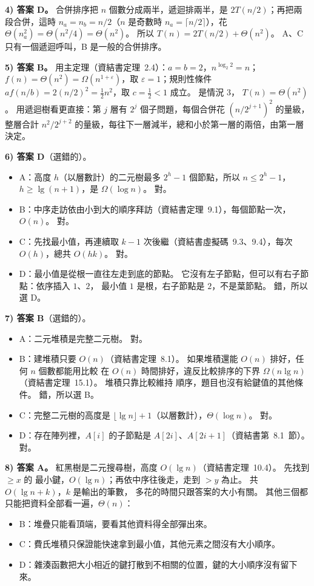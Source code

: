 \begin{pastsoln}
\textbf{4) 答案 D。} 合併排序把 $n$ 個數分成兩半，遞迴排兩半，是 $2T(n/2)$；再把兩段合併，這時
$n_a = n_b = n/2$（$n$ 是奇數時 $n_a = \lceil n/2 \rceil$），花 $\Theta(n_a^2) = \Theta(n^2/4) =
\Theta(n^2)$。 所以 $T(n) = 2T(n/2) + \Theta(n^2)$。 A、C 只有一個遞迴呼叫，B 是一般的合併排序。

\textbf{5) 答案 B。} 用主定理（資結書定理~2.4）：$a = b = 2$，$n^{\log_2 2} = n$；
$f(n) = \Theta(n^2) = \Omega(n^{1 + \varepsilon})$，取 $\varepsilon = 1$；規則性條件
$a f(n/b) = 2 (n/2)^2 = \frac{1}{2} n^2$，取 $c = \frac{1}{2} < 1$ 成立。 是情況 3，
$T(n) = \Theta(n^2)$。 用遞迴樹看更直接：第 $j$ 層有 $2^j$ 個子問題，每個合併花 $(n/2^{j+1})^2$
的量級，整層合計 $n^2 / 2^{j+2}$ 的量級，每往下一層減半，總和小於第一層的兩倍，由第一層決定。

\textbf{6) 答案 D}（選錯的）。
\begin{itemize}
\item A：高度 $h$（以層數計）的二元樹最多 $2^h - 1$ 個節點，所以 $n \le 2^h - 1$，
$h \ge \lg(n+1)$，是 $\Omega(\log n)$。 對。
\item B：中序走訪依由小到大的順序拜訪（資結書定理~9.1），每個節點一次，$O(n)$。 對。
\item C：先找最小值，再連續取 $k - 1$ 次後繼（資結書虛擬碼~9.3、9.4），每次 $O(h)$，總共 $O(hk)$。
對。
\item D：最小值是從根一直往左走到底的節點。 它沒有左子節點，但可以有右子節點：依序插入 $1$、$2$，
最小值 $1$ 是根，右子節點是 $2$，不是葉節點。 錯，所以選 D。
\end{itemize}

\textbf{7) 答案 B}（選錯的）。
\begin{itemize}
\item A：二元堆積是完整二元樹。 對。
\item B：建堆積只要 $O(n)$（資結書定理~8.1）。 如果堆積還能 $O(n)$ 排好，任何 $n$ 個數都能用比較
在 $O(n)$ 時間排好，違反比較排序的下界 $\Omega(n \lg n)$（資結書定理~15.1）。 堆積只靠比較維持
順序，題目也沒有給鍵值的其他條件。 錯，所以選 B。
\item C：完整二元樹的高度是 $\lfloor \lg n \rfloor + 1$（以層數計），$\Theta(\log n)$。 對。
\item D：存在陣列裡，$A[i]$ 的子節點是 $A[2i]$、$A[2i+1]$（資結書第~8.1~節）。 對。
\end{itemize}

\textbf{8) 答案 A。} 紅黑樹是二元搜尋樹，高度 $O(\lg n)$（資結書定理~10.4）。 先找到 $\ge x$ 的
最小鍵，$O(\lg n)$；再依中序往後走，走到 $> y$ 為止。 共 $O(\lg n + k)$，$k$ 是輸出的筆數，
多花的時間只跟答案的大小有關。 其他三個都只能把資料全部看一遍，$\Theta(n)$：
\begin{itemize}
\item B：堆疊只能看頂端，要看其他資料得全部彈出來。
\item C：費氏堆積只保證能快速拿到最小值，其他元素之間沒有大小順序。
\item D：雜湊函數把大小相近的鍵打散到不相關的位置，鍵的大小順序沒有留下來。
\end{itemize}


\end{pastsoln}
